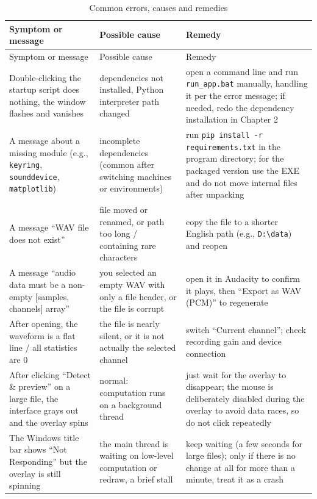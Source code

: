\documentclass[UTF8,a4paper,12pt]{ctexart}
\begin{document}
{\small
\begin{longtable}{@{}>{\raggedright\arraybackslash}p{}>{\raggedright\arraybackslash}p{}>{\raggedright\arraybackslash}p{}@{}}
\caption{Common errors, causes and remedies}\\
\toprule
Symptom or message & Possible cause & Remedy \\
\midrule
\endfirsthead
\toprule
Symptom or message & Possible cause & Remedy \\
\midrule
\endhead
\bottomrule
\endfoot
Double-clicking the startup script does nothing, the window flashes and vanishes & dependencies not installed, Python interpreter path changed & open a command line and run \texttt{run\_app.bat} manually, handling it per the error message; if needed, redo the dependency installation in Chapter 2 \\
A message about a missing module (e.g., \texttt{keyring}, \texttt{sounddevice}, \texttt{matplotlib}) & incomplete dependencies (common after switching machines or environments) & run \texttt{pip install -r requirements.txt} in the program directory; for the packaged version use the EXE and do not move internal files after unpacking \\
A message ``WAV file does not exist'' & file moved or renamed, or path too long / containing rare characters & copy the file to a shorter English path (e.g., \texttt{D:\textbackslash data}) and reopen \\
A message ``audio data must be a non-empty [samples, channels] array'' & you selected an empty WAV with only a file header, or the file is corrupt & open it in Audacity to confirm it plays, then ``Export as WAV (PCM)'' to regenerate \\
After opening, the waveform is a flat line / all statistics are 0 & the file is nearly silent, or it is not actually the selected channel & switch ``Current channel''; check recording gain and device connection \\
After clicking ``Detect \& preview'' on a large file, the interface grays out and the overlay spins & normal: computation runs on a background thread & just wait for the overlay to disappear; the mouse is deliberately disabled during the overlay to avoid data races, so do not click repeatedly \\
The Windows title bar shows ``Not Responding'' but the overlay is still spinning & the main thread is waiting on low-level computation or redraw, a brief stall & keep waiting (a few seconds for large files); only if there is no change at all for more than a minute, treat it as a crash \\

\end{longtable}}
\end{document}
